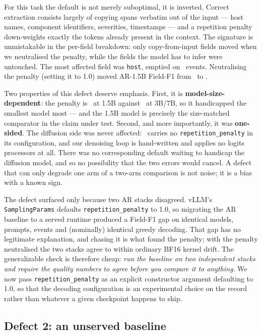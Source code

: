 For this task the default is not merely suboptimal, it is inverted. Correct
extraction consists largely of copying spans verbatim out of the input --- host
names, component identifiers, severities, timestamps --- and a repetition
penalty down-weights exactly the tokens already present in the context. The
signature is unmistakable in the per-field breakdown: only copy-from-input
fields moved when we neutralised the penalty, while the fields the model has to
infer were untouched. The most affected field was \texttt{host}, emptied on
\hostEmptied\ events. Neutralising the penalty (setting it to 1.0) moved AR-1.5B
Field-F1 from \arOneFiveFOneBefore\ to \arOneFiveFOneAfter.

Two properties of this defect deserve emphasis. First, it is
\textbf{model-size-dependent}: the penalty is \repPenaltySmall\ at 1.5B against
\repPenaltyLarge\ at 3B/7B, so it handicapped the smallest model most --- and
the 1.5B model is precisely the size-matched comparator in the claim under test.
Second, and more importantly, it was \textbf{one-sided}. The diffusion side was
never affected: \modelLLaDA\ carries no \texttt{repetition\_penalty} in its
configuration, and our denoising loop is hand-written and applies no logits
processors at all. There was no corresponding default waiting to handicap the
diffusion model, and so no possibility that the two errors would cancel. A
defect that can only degrade one arm of a two-arm comparison is not noise; it is
a bias with a known sign.

The defect surfaced only because two AR stacks disagreed. vLLM's
\texttt{SamplingParams} defaults \texttt{repetition\_penalty} to 1.0, so
migrating the AR baseline to a served runtime produced a Field-F1 gap on
identical models, prompts, events and (nominally) identical greedy decoding.
That gap has no legitimate explanation, and chasing it is what found the
penalty; with the penalty neutralised the two stacks agree to within ordinary
BF16 kernel drift. The generalizable check is therefore cheap: \emph{run the
baseline on two independent stacks and require the quality numbers to agree
before you compare it to anything}. We now pass \texttt{repetition\_penalty} as
an explicit constructor argument defaulting to 1.0, so that the decoding
configuration is an experimental choice on the record rather than whatever a
given checkpoint happens to ship.

\subsection{Defect 2: an unserved baseline}
\label{sec:defect2}

